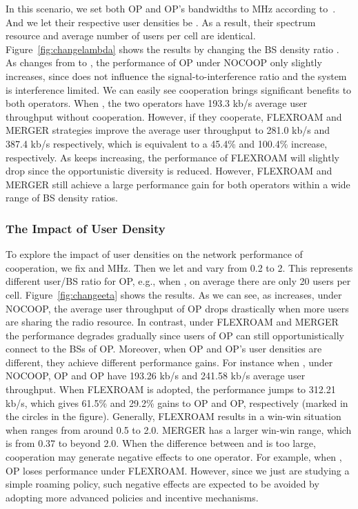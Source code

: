 \documentclass[conference]{IEEEtran}
\begin{document}
In this scenario, we set both OP and OP's bandwidths to  MHz according to~\cite{WiMAXEva}. And we let their respective user densities be . As a result, their spectrum resource and average number of users per cell are identical. Figure~\ref{fig:changelambda} shows the results by changing the BS density ratio . As  changes from  to , 	the performance of OP under NOCOOP only slightly increases, since  does not influence the signal-to-interference ratio and the system is interference limited. We can easily see cooperation brings significant benefits to both operators. When , the two operators have 193.3 kb/s average user throughput without cooperation. However, if they cooperate, FLEXROAM and MERGER strategies improve the average user throughput to 281.0 kb/s and 387.4 kb/s respectively, which is equivalent to a 45.4\% and 100.4\% increase, respectively.  As  keeps increasing, the performance of FLEXROAM will slightly drop since the opportunistic diversity is reduced. However, FLEXROAM and MERGER still achieve a large performance gain for both operators within a wide range of BS density ratios.


\subsubsection{The Impact of User Density}

To explore the impact of user densities on the network performance of cooperation, we fix  and  MHz. Then we let  and vary  from 0.2 to 2. This represents different user/BS ratio for OP, e.g., when , on average there are only 20 users per cell.  Figure~\ref{fig:changeeta} shows the results. As we can see, as  increases, under NOCOOP, the average user throughput of OP drops drastically when more users are sharing the radio resource. In contrast, under FLEXROAM and MERGER the performance degrades gradually since users of OP can still opportunistically connect to the BSs of OP. Moreover, when OP and OP's user densities are different, they achieve different performance gains. For instance when , under NOCOOP, OP and OP have 193.26 kb/s and 241.58 kb/s average user throughput. When FLEXROAM is adopted, the performance jumps to 312.21 kb/s, which gives 61.5\% and 29.2\% gains to OP and OP, respectively (marked in the circles in the figure). Generally, FLEXROAM results in a win-win situation when  ranges from around 0.5 to 2.0. MERGER has a larger win-win range, which is from 0.37 to beyond 2.0. When the difference between  and  is too large, cooperation may generate negative effects to one operator. For example, when , OP loses performance under FLEXROAM. However, since we just are studying a simple roaming policy, such negative effects are expected to be avoided by adopting more advanced policies and incentive mechanisms.
\end{document}
